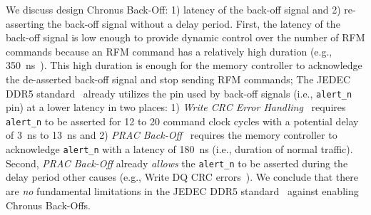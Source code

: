 We discuss  design   Chronus Back-Off:
1) latency of the back-off signal and
2) re-asserting the back-off signal without a delay period.
First, the latency of the back-off signal is low enough to provide dynamic control over the number of RFM commands because an RFM command has a relatively high duration (e.g., \SI{350}{\nano\second}~\cite{jedec2024jesd795c}).
This high duration is enough for the memory controller to acknowledge the de-asserted back-off signal and stop sending RFM commands;
The JEDEC DDR5 standard~\cite{jedec2024jesd795c} already utilizes the pin used by back-off signals (i.e., \texttt{alert\_n} pin) at a lower latency in two places:
1) \emph{Write CRC Error Handling}~\cite{jedec2024jesd795c} requires \texttt{alert\_n} to be asserted for 12 to 20 command clock cycles with a potential delay of \SI{3}{\nano\second} to \SI{13}{\nano\second} and
2) \emph{PRAC Back-Off}~\cite{jedec2024jesd795c} requires the memory controller to acknowledge \texttt{alert\_n} with a latency of \SI{180}{\nano\second} (i.e., duration of normal traffic). 
Second, \emph{PRAC Back-Off} already \emph{allows} the \texttt{alert\_n} to be asserted during the delay period  other causes (e.g., Write DQ CRC errors~\cite{jedec2024jesd795c}).
We conclude that there are \emph{no} fundamental limitations in the JEDEC DDR5 standard~\cite{jedec2024jesd795c} against enabling Chronus Back-Offs.
